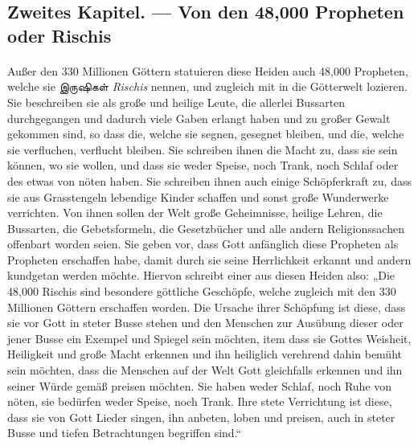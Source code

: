 \documentclass{article}
\newcommand{\TamilText}[1]{\texttamil{#1}}
\newcommand{\tam}[1]{\TamilText{#1}}
\begin{document}
\clearpage
\subsection{Zweites Kapitel. — Von den 48,000 Propheten oder Rischis}
\paragraph{}
Außer den 330 Millionen Göttern statuieren diese Heiden auch 48,000 Propheten, welche sie \tam{இருஷிகள்} \emph{Rischis} nennen, und zugleich mit in die Götterwelt lozieren. Sie beschreiben sie als große und heilige Leute, die allerlei Bussarten durchgegangen und dadurch viele Gaben erlangt haben und zu großer Gewalt gekommen sind, so dass die, welche sie segnen, gesegnet bleiben, und die, welche sie verfluchen, verflucht bleiben. Sie schreiben ihnen die Macht zu, dass sie sein können, wo sie wollen, und dass sie weder Speise, noch Trank, noch Schlaf oder des etwas von nöten haben. Sie schreiben ihnen auch einige Schöpferkraft zu, dass sie aus Grasstengeln lebendige Kinder schaffen und sonst große Wunderwerke verrichten. Von ihnen sollen der Welt große Geheimnisse, heilige Lehren, die Bussarten, die Gebetsformeln, die Gesetzbücher und alle andern Religionssachen offenbart worden seien. Sie geben vor, dass Gott anfänglich diese Propheten als Propheten erschaffen habe, damit durch sie seine Herrlichkeit erkannt und andern kundgetan werden möchte. Hiervon schreibt einer aus diesen Heiden also: „Die 48,000 Rischis sind besondere göttliche Geschöpfe, welche zugleich mit den 330 Millionen Göttern erschaffen worden. Die Ursache ihrer Schöpfung ist diese, dass sie vor Gott in steter Busse stehen und den Menschen zur Ausübung dieser oder jener Busse ein Exempel und Spiegel sein möchten, item dass sie Gottes Weisheit, Heiligkeit und große Macht erkennen und ihn heiliglich verehrend dahin bemüht sein möchten, dass die Menschen auf der Welt Gott gleichfalls erkennen und ihn seiner Würde gemäß preisen möchten. Sie haben weder Schlaf, noch Ruhe von nöten, sie bedürfen weder Speise, noch Trank. Ihre stete Verrichtung ist diese, dass sie von Gott Lieder singen, ihn anbeten, loben und preisen, auch in steter Busse und tiefen Betrachtungen begriffen sind.“
\end{document}
